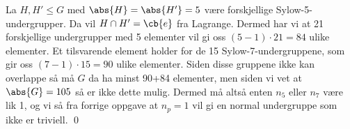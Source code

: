 La $H, H' \leq G$ med $\abs{H}=\abs{H'} = 5$ være forskjellige Sylow-5-undergrupper. Da vil 
$H\cap H' = \cb{e}$ fra Lagrange. Dermed har vi at 21 forskjellige undergrupper med 5 elementer
vil gi oss $(5-1)\cdot 21 = 84$ ulike elementer. Et tilsvarende element holder for de 15
Sylow-7-undergruppene, som gir oss $(7-1)\cdot 15 = 90$ ulike elementer. Siden disse gruppene
ikke kan overlappe så må $G$ da ha minst 90+84 elementer, men siden vi vet at $\abs{G}=105$ så 
er ikke dette mulig. Dermed må altså enten $n_5$ eller $n_7$ være lik 1, og vi så fra forrige
oppgave at $n_p = 1$ vil gi en normal undergruppe som ikke er triviell. \qed

